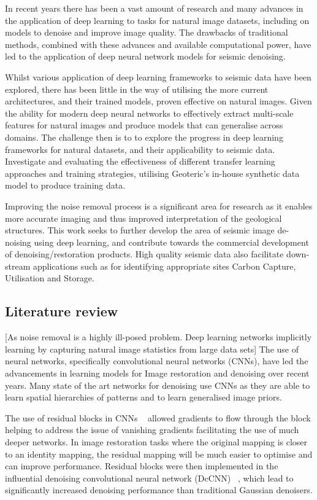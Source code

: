 \documentclass[project-plan]{report-template}
\begin{document}
In recent years there has been a vast amount of research and many advances in the application of deep learning to tasks for natural image datasets, including on models to denoise and improve image quality. The drawbacks of traditional methods, combined with these advances and available computational power, have led to the application of deep neural network models for seismic denoising. 

Whilst various application of deep learning frameworks to seismic data have been explored, there has been little in the way of utilising the more current architectures, and their trained models, proven effective on natural images. Given the ability for modern deep neural networks to effectively extract multi-scale  features for natural images and produce models that can generalise across domains. The challenge then is to to explore the progress in deep learning frameworks for natural datasets, and their applicability to seismic data. Investigate and evaluating the effectiveness of different transfer learning approaches and training strategies, utilising Geoteric's in-house synthetic data model to produce training data.

Improving the noise removal process is a significant area for research as it enables more accurate imaging and thus improved interpretation of the geological structures. This work seeks to further develop the area of seismic image de-noising using deep learning, and contribute towards the commercial development of denoising/restoration products. High quality seismic data also facilitate down-stream applications such as for identifying appropriate sites Carbon Capture, Utilisation and Storage.

\subsection{Literature review}
[As noise removal is a highly ill-posed problem. Deep learning networks implicitly learning by capturing natural image statistics from large data sets]
The use of neural networks, specifically convolutional neural networks (CNNs), have led the advancements in learning models for Image restoration and denoising over recent years. Many state of the art networks for denoising use CNNs as they are able to learn spatial hierarchies of patterns and to learn generalised image priors.

The use of residual blocks in CNNs ~\cite{he2015DeepRL} allowed gradients to flow through the block helping to address the issue of vanishing gradients facilitating the use of much deeper networks. In image restoration tasks where the original mapping is closer to an identity mapping, the residual mapping will be much easier to optimise and can improve performance. Residual blocks were then implemented in the influential denoising convolutional neural network (DcCNN) ~\cite{zhang2017beyond}, which lead to significantly increased denoising performance than traditional Gaussian denoisers.
\end{document}
